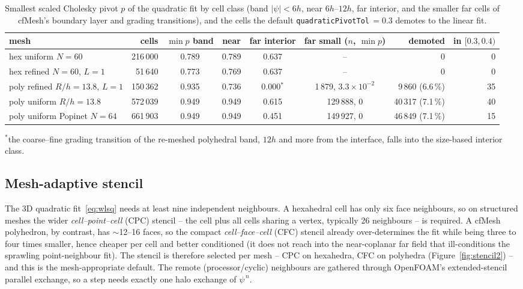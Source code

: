 \documentclass[preprint,3p,11pt]{elsarticle}
\newcommand{\psilev}{\psi}                       %
\begin{document}
\begin{table}[t]
  \centering\small
  \caption{Smallest scaled Cholesky pivot $p$ of the quadratic fit by cell class
    (band $|\psilev|<6h$, near $6h$--$12h$, far interior, and the smaller far cells of
    cfMesh's boundary layer and grading transitions), and the cells the default
    \texttt{quadraticPivotTol}\,$=0.3$ demotes to the linear fit.}
  \label{tab:pivot}
  \begin{tabular}{lrccccrr}
    \toprule
    mesh & cells & $\min p$ band & near & far interior & far small ($n$, $\min p$) & demoted & in $[0.3,0.4)$\\
    \midrule
    hex uniform $N=60$ & 216\,000 & 0.789 & 0.789 & 0.637 & -- & 0 & 0\\
    hex refined $N=60$, $L=1$ & 51\,640 & 0.773 & 0.769 & 0.637 & -- & 0 & 0\\
    poly refined $R/h=13.8$, $L=1$ & 150\,362 & 0.935 & 0.736 & 0.000$^{*}$ & 1\,879, $3.3\times10^{-2}$ & 9\,860 (6.6\,\%) & 35\\
    poly uniform $R/h=13.8$ & 572\,039 & 0.949 & 0.949 & 0.615 & 129\,888, 0 & 40\,317 (7.1\,\%) & 40\\
    poly uniform Popinet $N=64$ & 661\,903 & 0.949 & 0.949 & 0.451 & 149\,927, 0 & 46\,849 (7.1\,\%) & 15\\
    \bottomrule
  \end{tabular}
  \par\smallskip\raggedright\footnotesize $^{*}$the coarse--fine grading transition of the
  re-meshed polyhedral band, $12h$ and more from the interface, falls into the size-based
  interior class.
\end{table}

\subsection{Mesh-adaptive stencil}
\label{sec:stencil}
The 3D quadratic fit~\eqref{eq:wlsq} needs at least nine independent neighbours. A
hexahedral cell has only six face neighbours, so on structured meshes the wider
\emph{cell--point--cell} (CPC) stencil -- the cell plus all cells sharing a vertex,
typically 26 neighbours -- is required. A cfMesh polyhedron, by contrast, has
$\sim$12--16 faces, so the compact \emph{cell--face--cell} (CFC) stencil already
over-determines the fit while being three to four times smaller, hence cheaper per
cell and better conditioned (it does not reach into the near-coplanar far field that
ill-conditions the sprawling point-neighbour fit). The stencil is therefore selected
per mesh -- CPC on hexahedra, CFC on polyhedra (Figure~\ref{fig:stencil2}) -- and this
is the mesh-appropriate default. The remote (processor/cyclic) neighbours are gathered
through OpenFOAM's extended-stencil parallel exchange, so a step needs exactly one
halo exchange of $\psilev^{\,n}$.
\end{document}
